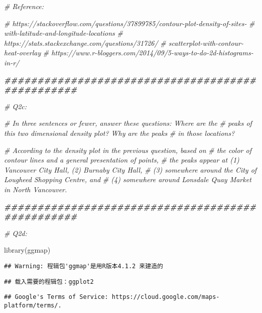 \documentclass[
]{article}
\newenvironment{Shaded}{\begin{snugshade}}{\end{snugshade}}
\newcommand{\CommentTok}[1]{\textcolor[rgb]{0.56,0.35,0.01}{\textit{#1}}}
\newcommand{\DocumentationTok}[1]{\textcolor[rgb]{0.56,0.35,0.01}{\textbf{\textit{#1}}}}
\newcommand{\FunctionTok}[1]{\textcolor[rgb]{0.00,0.00,0.00}{#1}}
\newcommand{\NormalTok}[1]{#1}
\begin{document}
\begin{Shaded}
\begin{Highlighting}[]
\CommentTok{\# Reference:}

\CommentTok{\# https://stackoverflow.com/questions/37899785/contour{-}plot{-}density{-}of{-}sites{-}}
\CommentTok{\# with{-}latitude{-}and{-}longitude{-}locations}
\CommentTok{\# https://stats.stackexchange.com/questions/31726/}
\CommentTok{\# scatterplot{-}with{-}contour{-}heat{-}overlay}
\CommentTok{\# https://www.r{-}bloggers.com/2014/09/5{-}ways{-}to{-}do{-}2d{-}histograms{-}in{-}r/}





\DocumentationTok{\#\#\#\#\#\#\#\#\#\#\#\#\#\#\#\#\#\#\#\#\#\#\#\#\#\#\#\#\#\#\#\#\#\#\#\#\#\#\#\#\#\#\#\#\#\#\#\#\#}

\CommentTok{\# Q2c:}

\CommentTok{\# In three sentences or fewer, answer these questions: Where are the}
\CommentTok{\# peaks of this two dimensional density plot? Why are the peaks}
\CommentTok{\# in those locations?}

\CommentTok{\# According to the density plot in the previous question, based on}
\CommentTok{\# the color of contour lines and a general presentation of points,}
\CommentTok{\# the peaks appear at (1) Vancouver City Hall, (2) Burnaby City Hall,}
\CommentTok{\# (3) somewhere around the City of Lougheed Shopping Centre, and}
\CommentTok{\# (4) somewhere around Lonsdale Quay Market in North Vancouver.}



\DocumentationTok{\#\#\#\#\#\#\#\#\#\#\#\#\#\#\#\#\#\#\#\#\#\#\#\#\#\#\#\#\#\#\#\#\#\#\#\#\#\#\#\#\#\#\#\#\#\#\#\#\#}


\CommentTok{\# Q2d:}

\FunctionTok{library}\NormalTok{(ggmap)}
\end{Highlighting}
\end{Shaded}

\begin{verbatim}
## Warning: 程辑包'ggmap'是用R版本4.1.2 来建造的
\end{verbatim}

\begin{verbatim}
## 载入需要的程辑包：ggplot2
\end{verbatim}

\begin{verbatim}
## Google's Terms of Service: https://cloud.google.com/maps-platform/terms/.
\end{verbatim}
\end{document}
